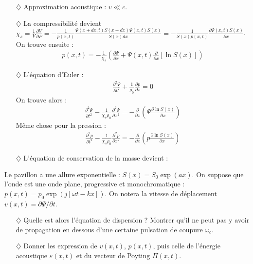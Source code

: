 \documentclass{report}
\begin{document}
\begin{itemize}

\item[$\diamondsuit$] Approximation acoustique : $v\ll c$.

\item[$\diamondsuit$] La compressibilité devient $\chi_s=\frac{1}{V}\frac{\partial V}{\partial P}=-\frac{1}{p(x,t)}\frac{\Psi(x+dx,t)S(x+dx)\Psi(x,t)S(x)}{S(x)dx}=-\frac{1}{S(x)p(x,t)}\frac{\partial \Psi(x,t)S(x)}{\partial x}$. On trouve ensuite :
\begin{align*}
	p(x,t) = -\frac{1}{\chi_s}\left(\frac{\partial \Psi}{\partial x}+\Psi(x,t)\frac{\partial }{\partial x}\left[\ln S(x) \right]  \right)
\end{align*}

\item[$\diamondsuit$] L'équation d'Euler :
\begin{align*}
	\frac{\partial^2\Psi}{\partial t^2}+\frac{1}{\rho_0}\frac{\partial p}{\partial x}=0
\end{align*}
On trouve alors :
\begin{align*}
	\frac{\partial^2\Psi}{\partial t^2}-\frac{1}{\chi_s\rho_0}\frac{\partial^2 \Psi}{\partial x^2}=-\frac{\partial}{\partial x}\left(\Psi \frac{\partial \ln S(x)}{\partial x} \right) 
\end{align*}
Même chose pour la pression :
\begin{align*}
	\frac{\partial^2p}{\partial t^2}-\frac{1}{\chi_s\rho_0}\frac{\partial^2 p}{\partial x^2}=-\frac{\partial}{\partial x}\left(p \frac{\partial \ln S(x)}{\partial x} \right) 
\end{align*}

\item[$\diamondsuit$] L'équation de conservation de la masse devient :
\end{itemize}

Le pavillon a une allure exponentielle : $S(x)=S_0\exp(ax)$. On suppose que l'onde est une onde plane, progressive et monochromatique : $p(x,t)=p_0\exp\left(j[\omega t-kx] \right)$. On notera la vitesse de déplacement $v(x,t)=\partial\Psi/\partial t$.

\begin{itemize}

\item[$\diamondsuit$]  Quelle est alors l'équation de dispersion ? Montrer qu'il ne peut pas y avoir de propagation en dessous d'une certaine pulsation de coupure $\omega_c$.

\item[$\diamondsuit$] Donner les expression de $v(x,t)$, $p(x,t)$, puis celle de l'énergie acoustique $\varepsilon(x,t)$ et du vecteur de Poyting $\Pi(x,t)$.

\end{itemize}
\end{document}
